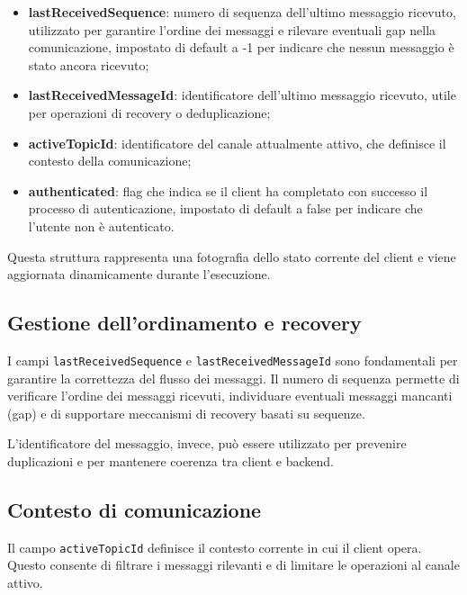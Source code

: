\documentclass[a4paper, 11pt, twoside]{report}
\begin{document}
\begin{itemize}
    \item \textbf{lastReceivedSequence}: numero di sequenza dell'ultimo messaggio ricevuto, utilizzato per garantire l'ordine dei
    messaggi e rilevare eventuali gap nella comunicazione, impostato di default a -1 per indicare che nessun messaggio è stato 
    ancora ricevuto;
    
    \item \textbf{lastReceivedMessageId}: identificatore dell'ultimo messaggio ricevuto, utile per operazioni di recovery o 
    deduplicazione;
    
    \item \textbf{activeTopicId}: identificatore del canale attualmente attivo, che definisce il contesto della comunicazione;
    
    \item \textbf{authenticated}: flag che indica se il client ha completato con successo il processo di autenticazione, 
    impostato di default a false per indicare che l'utente non è autenticato.
\end{itemize}

Questa struttura rappresenta una fotografia dello stato corrente del client e viene aggiornata dinamicamente durante l'esecuzione.

\subsection{Gestione dell'ordinamento e recovery}

I campi \texttt{lastReceivedSequence} e \texttt{lastReceivedMessageId} sono fondamentali per garantire la correttezza del flusso
dei messaggi.
Il numero di sequenza permette di verificare l'ordine dei messaggi ricevuti, individuare eventuali messaggi mancanti (gap) e di
supportare meccanismi di recovery basati su sequenze.

L'identificatore del messaggio, invece, può essere utilizzato per prevenire duplicazioni e per mantenere coerenza tra client e backend.

\subsection{Contesto di comunicazione}

Il campo \texttt{activeTopicId} definisce il contesto corrente in cui il client opera. Questo consente di filtrare i messaggi
rilevanti e di limitare le operazioni al canale attivo.
\end{document}
